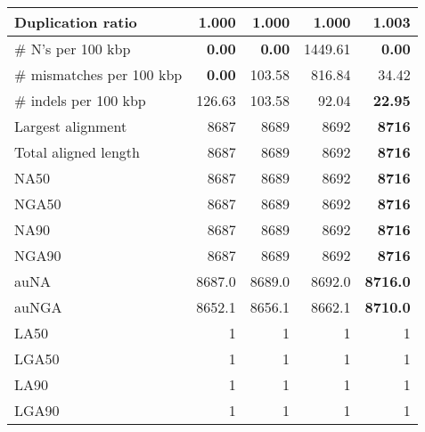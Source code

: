 \documentclass[12pt,a4paper]{article}
\begin{document}
\begin{table}[ht]
\begin{center}
\begin{tabular}{|l*{4}{|r}|}
Duplication ratio & {\bf 1.000} & {\bf 1.000} & {\bf 1.000} & 1.003 \\ \hline
\# N's per 100 kbp & {\bf 0.00} & {\bf 0.00} & 1449.61 & {\bf 0.00} \\ \hline
\# mismatches per 100 kbp & {\bf 0.00} & 103.58 & 816.84 & 34.42 \\ \hline
\# indels per 100 kbp & 126.63 & 103.58 & 92.04 & {\bf 22.95} \\ \hline
Largest alignment & 8687 & 8689 & 8692 & {\bf 8716} \\ \hline
Total aligned length & 8687 & 8689 & 8692 & {\bf 8716} \\ \hline
NA50 & 8687 & 8689 & 8692 & {\bf 8716} \\ \hline
NGA50 & 8687 & 8689 & 8692 & {\bf 8716} \\ \hline
NA90 & 8687 & 8689 & 8692 & {\bf 8716} \\ \hline
NGA90 & 8687 & 8689 & 8692 & {\bf 8716} \\ \hline
auNA & 8687.0 & 8689.0 & 8692.0 & {\bf 8716.0} \\ \hline
auNGA & 8652.1 & 8656.1 & 8662.1 & {\bf 8710.0} \\ \hline
LA50 & 1 & 1 & 1 & 1 \\ \hline
LGA50 & 1 & 1 & 1 & 1 \\ \hline
LA90 & 1 & 1 & 1 & 1 \\ \hline
LGA90 & 1 & 1 & 1 & 1 \\ \hline
\end{tabular}
\end{center}
\end{table}
\end{document}
